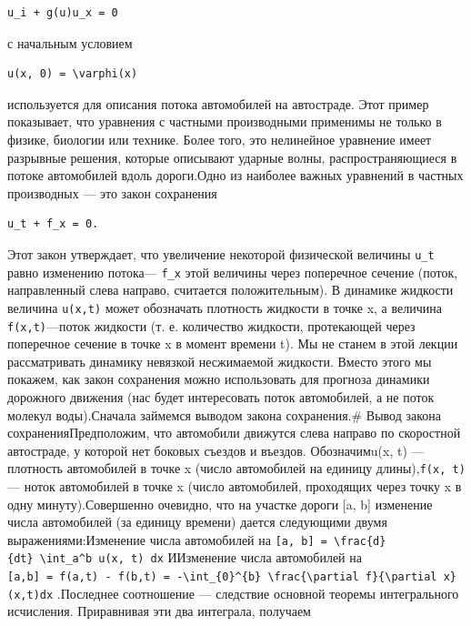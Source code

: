 \documentclass[
  ukrainian,
]{article}
\begin{document}
\begin{verbatim}
u_i + g(u)u_x = 0
\end{verbatim}

с начальным условием

\begin{verbatim}
u(x, 0) = \varphi(x)
\end{verbatim}

используется для описания потока автомобилей на автостраде. Этот пример
показывает, что уравнения с частными производными применимы не только в
физике, биологии или технике. Более того, это нелинейное уравнение имеет
разрывные решения, которые описывают ударные волны, распространяющиеся в
потоке автомобилей вдоль дороги.Одно из наиболее важных уравнений в
частных производных --- это закон сохранения

\begin{verbatim}
u_t + f_x = 0.
\end{verbatim}

Этот закон утверждает, что увеличение некоторой физической величины
\texttt{u\_t} равно изменению потока--- \texttt{f\_x} этой величины
через поперечное сечение (поток, направленный слева направо, считается
положительным). В динамике жидкости величина \texttt{u(x,t)} может
обозначать плотность жидкости в точке x, а величина
\texttt{f(x,t)}---поток жидкости (т. е. количество жидкости, протекающей
через поперечное сечение в точке x в момент времени t). Мы не станем в
этой лекции рассматривать динамику невязкой несжимаемой жидкости. Вместо
этого мы покажем, как закон сохранения можно использовать для прогноза
динамики дорожного движения (нас будет интересовать поток автомобилей, а
не поток молекул воды).Сначала займемся выводом закона сохранения.\#
Вывод закона сохраненияПредположим, что автомобили движутся слева
направо по скоростной автостраде, у которой нет боковых съездов и
въездов. Обозначимu(x, t) --- плотность автомобилей в точке x (число
автомобилей на единицу длины),\texttt{f(x,\ t)} --- ноток автомобилей в
точке x (число автомобилей, проходящих через точку x в одну
минуту).Совершенно очевидно, что на участке дороги {[}a, b{]} изменение
числа автомобилей (за единицу времени) дается следующими двумя
выражениями:Изменение числа автомобилей на
\texttt{{[}a,\ b{]}\ =\ \textbackslash{}frac\{d\}\{dt\}\ \textbackslash{}int\_a\^{}b\ u(x,\ t)\ dx}
ИИзменение числа автомобилей на
\texttt{{[}a,b{]}\ =\ f(a,t)\ -\ f(b,t)\ =\ -\textbackslash{}int\_\{0\}\^{}\{b\}\ \textbackslash{}frac\{\textbackslash{}partial\ f\}\{\textbackslash{}partial\ x\}(x,t)dx}
.Последнее соотношение --- следствие основной теоремы интегрального
исчисления. Приравнивая эти два интеграла, получаем
\end{document}
